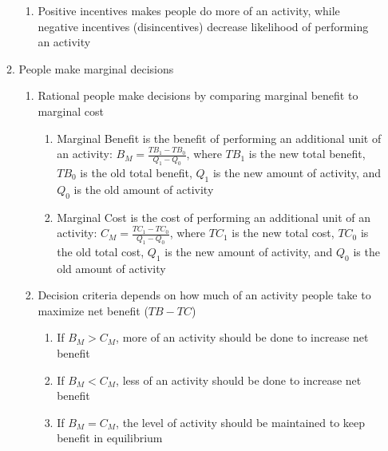 \documentclass[12pt]{article}
\begin{document}
\begin{enumerate}
\begin{enumerate}
\begin{enumerate}
              \item Positive incentives makes people do more of an activity, while negative incentives (disincentives) decrease likelihood of performing an activity

            \end{enumerate}

          \item People make marginal decisions

            \begin{enumerate}

              \item Rational people make decisions by comparing marginal benefit to marginal cost

                \begin{enumerate}

                  \item Marginal Benefit is the benefit of performing an additional unit of an activity: $B_M=\frac{TB_1-TB_0}{Q_1-Q_0}$, where $TB_1$ is the new total benefit, $TB_0$ is the old total benefit, $Q_1$ is the new amount of activity, and $Q_0$ is the old amount of activity

                  \item Marginal Cost is the cost of performing an additional unit of an activity: $C_M=\frac{TC_1-TC_0}{Q_1-Q_0}$, where $TC_1$ is the new total cost, $TC_0$ is the old total cost, $Q_1$ is the new amount of activity, and $Q_0$ is the old amount of activity

                \end{enumerate}

              \item Decision criteria depends on how much of an activity people take to maximize net benefit ($TB-TC$)

                \begin{enumerate}

                  \item If $B_M>C_M$, more of an activity should be done to increase net benefit

                  \item If $B_M<C_M$, less of an activity should be done to increase net benefit

                  \item If $B_M=C_M$, the level of activity should be maintained to keep benefit in equilibrium

                \end{enumerate}


\end{enumerate}
\end{enumerate}
\end{enumerate}
\end{document}
